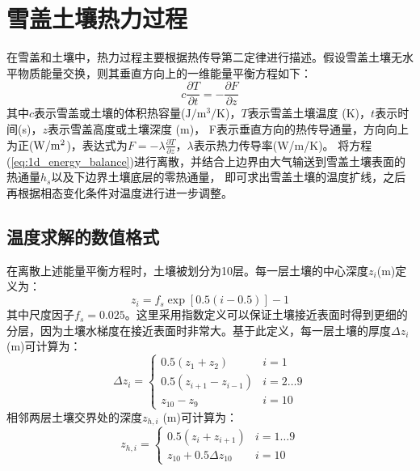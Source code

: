 \chapter{雪盖土壤热力过程}


在雪盖和土壤中，热力过程主要根据热传导第二定律进行描述。假设雪盖土壤无水平物质能量交换，则其垂直方向上的一维能量平衡方程如下：
\begin{equation}\label{eq:1d_energy_balance}
c \frac{\partial T}{\partial t}=-\frac{\partial F}{\partial z}
\end{equation}
其中$c$表示雪盖或土壤的体积热容量($\mathrm{J/m^3/K}$)，$T$表示雪盖土壤温度 (K)，$t$表示时间(s)，$z$表示雪盖高度或土壤深度 (m)，
F表示垂直方向的热传导通量，方向向上为正($\rm W/m^2$)，表达式为$F=-\lambda\frac{\partial T}{\partial z}$，$\lambda$表示热力传导率(W/m/K)。
将方程(\ref{eq:1d_energy_balance})进行离散，并结合上边界由大气输送到雪盖土壤表面的热通量$h_s$以及下边界土壤底层的零热通量，
即可求出雪盖土壤的温度扩线，之后再根据相态变化条件对温度进行进一步调整。


\section{温度求解的数值格式}\label{温度求解的数值格式}
在离散上述能量平衡方程时，土壤被划分为10层。每一层土壤的中心深度$z_i$(m)定义为：
\begin{equation}
z_{i}=f_{s} \exp [0.5(i-0.5)]-1
\end{equation}
%
其中尺度因子$f_s=0.025$。这里采用指数定义可以保证土壤接近表面时得到更细的分层，因为土壤水梯度在接近表面时非常大。基于此定义，每一层土壤的厚度$\Delta z_i$ (m)可计算为：
\begin{equation}
\Delta z_{i}=\left\{\begin{array}{ll}0.5\left(z_{1}+z_{2}\right) & i=1 \\ 0.5\left(z_{i+1}-z_{i-1}\right) & i=2 \ldots 9 \\ z_{10}-z_{9} & i=10\end{array}\right.
\end{equation}
相邻两层土壤交界处的深度$z_{h,i}$ (m)可计算为：
\begin{equation}
z_{h, i}=\left\{\begin{array}{ll}0.5\left(z_{i}+z_{i+1}\right) & i=1 \ldots 9 \\ z_{10}+0.5 \Delta z_{10} & i=10\end{array}\right.
\end{equation}



